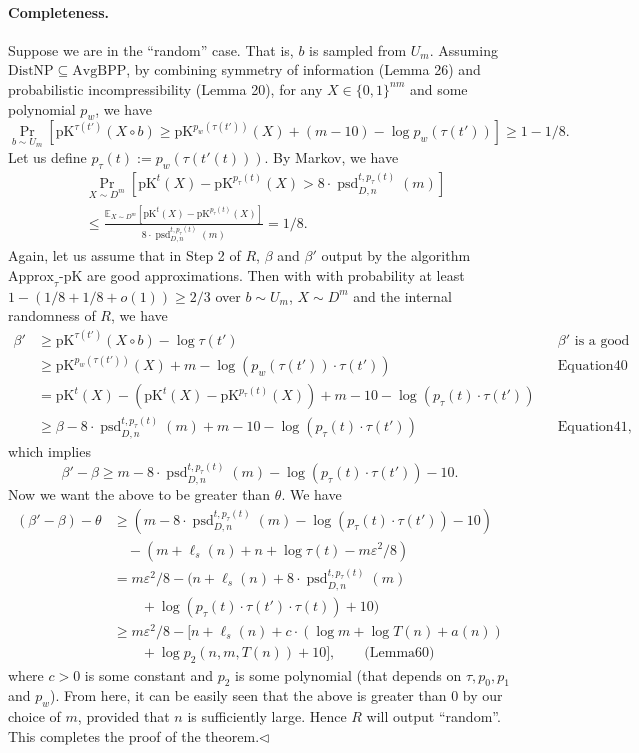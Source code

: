 \paragraph{Completeness.} Suppose we are in the ``random'' case. That is, $b$ is sampled from $U_m$. Assuming $\mathrm{DistNP}\subseteq\mathrm{AvgBPP}$, by combining symmetry of information (Lemma 26) and probabilistic incompressibility (Lemma 20), for any $X\in\{0,1\}^{nm}$ and some polynomial $p_w$, we have
\[\Pr_{b\sim U_m}[\mathrm{pK}^{\tau(t')}(X\circ b)\geq\mathrm{pK}^{p_w(\tau(t'))}(X)+(m-10)-\log p_w(\tau(t'))]\geq1-1/8.\tag{40}\]
Let us define $p_\tau(t):=p_w(\tau(t'(t)))$. By Markov, we have
\begin{align*}
&\Pr_{X\sim D^m}[\mathrm{pK}^t(X)-\mathrm{pK}^{p_\tau(t)}(X)>8\cdot\operatorname{psd}_{D,n}^{t,p_\tau(t)}(m)]\\
&\leq\frac{\mathbb E_{X\sim D^m}[\mathrm{pK}^t(X)-\mathrm{pK}^{p_\tau(t)}(X)]}{8\cdot\operatorname{psd}_{D,n}^{t,p_\tau(t)}(m)}=1/8.\tag{41}
\end{align*}
Again, let us assume that in Step 2 of $R$, $\beta$ and $\beta'$ output by the algorithm $\mathrm{Approx}_\tau\text{-}\mathrm{pK}$ are good approximations. Then with with probability at least $1-(1/8+1/8+o(1))\geq2/3$ over $b\sim U_m$, $X\sim D^m$ and the internal randomness of $R$, we have
\begin{align*}
\beta'&\geq\mathrm{pK}^{\tau(t')}(X\circ b)-\log\tau(t')&&\beta'\text{ is a good approximation}\\
&\geq\mathrm{pK}^{p_w(\tau(t'))}(X)+m-\log(p_w(\tau(t'))\cdot\tau(t'))&&\text{Equation40}\\
&=\mathrm{pK}^t(X)-(\mathrm{pK}^t(X)-\mathrm{pK}^{p_\tau(t)}(X))+m-10-\log(p_\tau(t)\cdot\tau(t'))\\
&\geq\beta-8\cdot\operatorname{psd}_{D,n}^{t,p_\tau(t)}(m)+m-10-\log(p_\tau(t)\cdot\tau(t'))&&\text{Equation41},
\end{align*}
which implies
\[\beta'-\beta\geq m-8\cdot\operatorname{psd}_{D,n}^{t,p_\tau(t)}(m)-\log(p_\tau(t)\cdot\tau(t'))-10.\]
Now we want the above to be greater than $\theta$. We have
\begin{align*}
(\beta'-\beta)-\theta
&\geq(m-8\cdot\operatorname{psd}_{D,n}^{t,p_\tau(t)}(m)-\log(p_\tau(t)\cdot\tau(t'))-10)\\
&\quad-(m+\ell_s(n)+n+\log\tau(t)-m\varepsilon^2/8)\\
&=m\varepsilon^2/8-(n+\ell_s(n)+8\cdot\operatorname{psd}_{D,n}^{t,p_\tau(t)}(m)\\
&\qquad+\log(p_\tau(t)\cdot\tau(t')\cdot\tau(t))+10)\\
&\geq m\varepsilon^2/8-[n+\ell_s(n)+c\cdot(\log m+\log T(n)+a(n))\\
&\qquad+\log p_2(n,m,T(n))+10],\qquad\text{(Lemma60)}
\end{align*}
where $c>0$ is some constant and $p_2$ is some polynomial (that depends on $\tau,p_0,p_1$ and $p_w$). From here, it can be easily seen that the above is greater than $0$ by our choice of $m$, provided that $n$ is sufficiently large. Hence $R$ will output ``random''. This completes the proof of the theorem.\hfill$\triangleleft$
